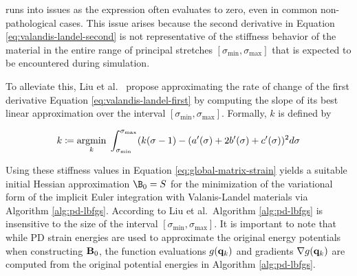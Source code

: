 \noindent runs into issues as the expression often evaluates to zero, even in common non-pathological cases. This issue arises because
the second derivative in Equation \ref{eq:valandis-landel-second} is not representative of the stiffness behavior of the material in the 
entire range of principal stretches $[\sigma_{\text{min}}, \sigma_{\text{max}}]$ that is expected to be encountered during simulation.

To alleviate this, Liu et al.\ \cite{liu2017} propose approximating the rate of change of the first derivative Equation \ref{eq:valandis-landel-first}
by computing the slope of its best linear approximation over the interval $[\sigma_{\text{min}}, \sigma_{\text{max}}]$. Formally, $k$ is 
defined by

\begin{equation}\label{eq:valanis-landel-k}
    k \coloneqq \underset{k}{\operatorname{argmin}}\; \int^{\sigma_{\text{max}}}_{\sigma_{\text{min}}} (k(\sigma - 1) - (a^{\prime}(\sigma) + 2b^{\prime}(\sigma) + 
    c^{\prime}(\sigma))^2 d\sigma
\end{equation}

\noindent Using these stiffness values in Equation \ref{eq:global-matrix-strain} yields a suitable initial Hessian approximation $\B_0 = S$ for
the minimization of the variational form of the implicit Euler integration with Valanis-Landel materials via Algorithm \ref{alg:pd-lbfgs}. According
to Liu et al.\ Algorithm \ref{alg:pd-lbfgs} is insensitive to the size of the interval $[\sigma_{\text{min}}, \sigma_{\text{max}}]$. It is important
to note that while PD strain energies are used to approximate the original energy potentials when constructing $\mathbf{B}_0$, the function
evaluations $g(\mathbf{q}_k)$ and gradients $\nabla g(\mathbf{q}_k)$ are computed from the original potential energies in Algorithm \ref{alg:pd-lbfgs}.

